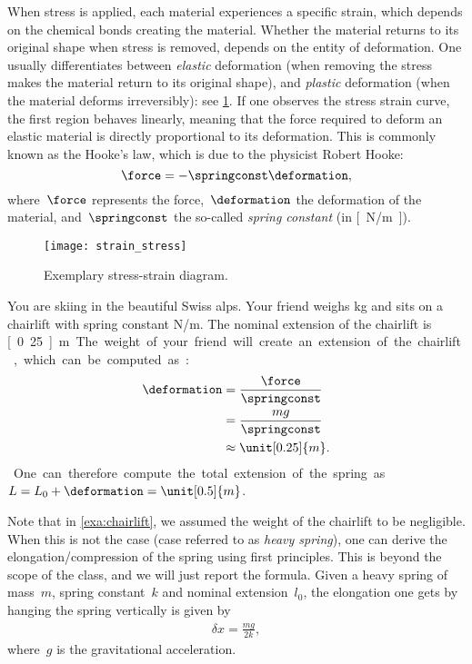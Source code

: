 When stress is applied, each material experiences a specific strain, which depends on the chemical bonds creating the material.
Whether the material returns to its original shape when stress is removed, depends on the entity of deformation.
One usually differentiates between \emph{elastic} deformation (when removing the stress makes the material return to its original shape), and \emph{plastic} deformation (when the material deforms irreversibly): see \cref{fig:stress_strain}.
If one observes the stress \vs strain curve, the first region behaves linearly, meaning that the force required to deform an elastic material is directly proportional to its deformation.
This is commonly known as the Hooke's law, which is due to the physicist Robert Hooke:
\begin{equation}
    \force=-\springconst \deformation,
\end{equation}
where~$\force$ represents the force,~$\deformation$ the deformation of the material, and~$\springconst$ the so-called \emph{spring constant} (in \unit[]{[N/m]}).

\begin{figure}[h]
    \centering
    \texttt{[image: strain\_stress]}
    \caption{Exemplary stress-strain diagram. }
    \label{fig:stress_strain}
\end{figure}

\begin{example}
    \label{exa:chairlift}
    You are skiing in the beautiful Swiss alps.
    Your friend weighs \unit[100]{kg} and sits on a chairlift with spring constant \unit[4,000]{N/m}.
    The nominal extension of the chairlift is \unit[0.25]{m}.
    The weight of your friend will create an extension of the chairlift, which can be computed as:
    \begin{equation}
        \begin{aligned}
            \deformation & =\frac{\force}{\springconst} \\
            & =\frac{mg}{\springconst} \\
            & \approx \unit[0.25]{m}.
        \end{aligned}
    \end{equation}
    One can therefore compute the total extension of the spring as~$L=L_0+\deformation=\unit[0.5]{m}$.
\end{example}

Note that in \cref{exa:chairlift}, we assumed the weight of the chairlift to be negligible.
When this is not the case (case referred to as \emph{heavy spring}), one can derive the elongation/compression of the spring using first principles.
This is beyond the scope of the class, and we will just report the formula.
Given a heavy spring of mass~$m$, spring constant~$k$ and nominal extension~$l_0$, the elongation one gets by hanging the spring vertically is given by
\begin{equation}
    \begin{aligned}
        \delta x =\frac{m g}{2k},
    \end{aligned}
\end{equation}
where~$g$ is the gravitational acceleration.

